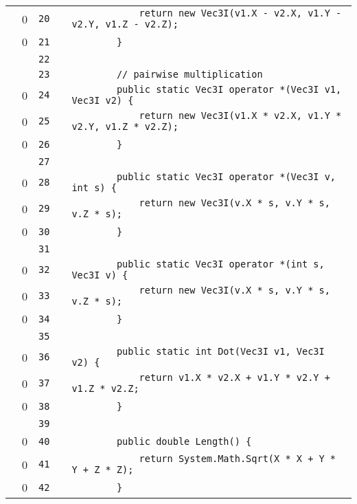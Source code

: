 \documentclass[a4paper,landscape,10pt]{article}
\begin{document}
\begin{longtable}[l]{lrrll}
\cellcolor{red} & 0 & \verb~20~ & & \verb~            return new Vec3I(v1.X - v2.X, v1.Y - v2.Y, v1.Z - v2.Z);~\\
\cellcolor{red} & 0 & \verb~21~ & & \verb~        }~\\
\cellcolor{gray} &  & \verb~22~ & & \verb~~\\
\cellcolor{gray} &  & \verb~23~ & & \verb~        // pairwise multiplication~\\
\cellcolor{red} & 0 & \verb~24~ & & \verb~        public static Vec3I operator *(Vec3I v1, Vec3I v2) {~\\
\cellcolor{red} & 0 & \verb~25~ & & \verb~            return new Vec3I(v1.X * v2.X, v1.Y * v2.Y, v1.Z * v2.Z);~\\
\cellcolor{red} & 0 & \verb~26~ & & \verb~        }~\\
\cellcolor{gray} &  & \verb~27~ & & \verb~~\\
\cellcolor{red} & 0 & \verb~28~ & & \verb~        public static Vec3I operator *(Vec3I v, int s) {~\\
\cellcolor{red} & 0 & \verb~29~ & & \verb~            return new Vec3I(v.X * s, v.Y * s, v.Z * s);~\\
\cellcolor{red} & 0 & \verb~30~ & & \verb~        }~\\
\cellcolor{gray} &  & \verb~31~ & & \verb~~\\
\cellcolor{red} & 0 & \verb~32~ & & \verb~        public static Vec3I operator *(int s, Vec3I v) {~\\
\cellcolor{red} & 0 & \verb~33~ & & \verb~            return new Vec3I(v.X * s, v.Y * s, v.Z * s);~\\
\cellcolor{red} & 0 & \verb~34~ & & \verb~        }~\\
\cellcolor{gray} &  & \verb~35~ & & \verb~~\\
\cellcolor{red} & 0 & \verb~36~ & & \verb~        public static int Dot(Vec3I v1, Vec3I v2) {~\\
\cellcolor{red} & 0 & \verb~37~ & & \verb~            return v1.X * v2.X + v1.Y * v2.Y + v1.Z * v2.Z;~\\
\cellcolor{red} & 0 & \verb~38~ & & \verb~        }~\\
\cellcolor{gray} &  & \verb~39~ & & \verb~~\\
\cellcolor{red} & 0 & \verb~40~ & & \verb~        public double Length() {~\\
\cellcolor{red} & 0 & \verb~41~ & & \verb~            return System.Math.Sqrt(X * X + Y * Y + Z * Z);~\\
\cellcolor{red} & 0 & \verb~42~ & & \verb~        }~\\

\end{longtable}
\end{document}
